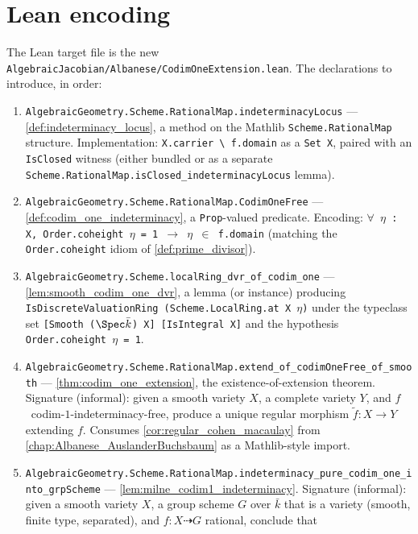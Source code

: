 \section{Lean encoding}
\label{sec:codim1_lean_encoding}

The Lean target file is the new
\texttt{AlgebraicJacobian/Albanese/CodimOneExtension.lean}. The declarations to
introduce, in order:

\begin{enumerate}
  \item \texttt{AlgebraicGeometry.Scheme.RationalMap.indeterminacyLocus} ---
    \cref{def:indeterminacy_locus}, a method on the Mathlib
    \texttt{Scheme.RationalMap} structure. Implementation: \texttt{X.carrier
    \textbackslash{} f.domain} as a \texttt{Set X}, paired with an
    \texttt{IsClosed} witness (either bundled or as a separate
    \texttt{Scheme.RationalMap.isClosed\_indeterminacyLocus} lemma).
  \item \texttt{AlgebraicGeometry.Scheme.RationalMap.CodimOneFree} ---
    \cref{def:codim_one_indeterminacy}, a \texttt{Prop}-valued predicate. Encoding:
    \texttt{\(\forall\) \(\eta\) : X, Order.coheight \(\eta\) = 1 \(\to\) \(\eta\) \(\in\)
    f.domain} (matching the \texttt{Order.coheight} idiom of
    \cref{def:prime_divisor}).
  \item \texttt{AlgebraicGeometry.Scheme.localRing\_dvr\_of\_codim\_one} ---
    \cref{lem:smooth_codim_one_dvr}, a lemma (or instance) producing
    \texttt{IsDiscreteValuationRing (Scheme.LocalRing.at\ X \(\eta\))} under the
    typeclass set \texttt{[Smooth (\(\Spec \bar k\)) X] [IsIntegral X]} and the
    hypothesis \texttt{Order.coheight \(\eta\) = 1}.
  \item \texttt{AlgebraicGeometry.Scheme.RationalMap.extend\_of\_codimOneFree\_of\_smooth}
    --- \cref{thm:codim_one_extension}, the existence-of-extension theorem. Signature
    (informal): given a smooth variety \(X\), a complete variety \(Y\), and
    \(f\)~codim-\(1\)-indeterminacy-free, produce a unique regular morphism
    \(\widetilde f \colon X \to Y\) extending \(f\). Consumes
    \cref{cor:regular_cohen_macaulay} from
    \cref{chap:Albanese_AuslanderBuchsbaum} as a Mathlib-style import.
  \item \texttt{AlgebraicGeometry.Scheme.RationalMap.indeterminacy\_pure\_codim\_one\_into\_grpScheme}
    --- \cref{lem:milne_codim1_indeterminacy}. Signature (informal): given a smooth
    variety \(X\), a group scheme \(G\) over \(\bar k\) that is a variety (smooth, finite
    type, separated), and \(f \colon X \dashrightarrow G\) rational, conclude that

\end{enumerate}
